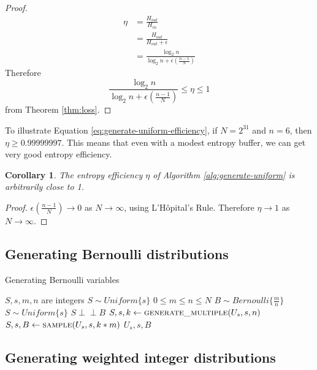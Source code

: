 \documentclass[12pt]{article}
\newtheorem{corollary}{Corollary}
\newcommand{\indep}{\perp\!\!\!\perp}
\begin{document}
\begin{proof}
\begin{align}
    \eta & = \frac{H_{out}}{H_{in}} \\
         & = \frac{H_{out}}{H_{out}+\epsilon} \\
         & = \frac{\log_2n}{\log_2n + \epsilon(\frac{n-1}{N})}
\end{align}
Therefore 
\begin{equation}
\frac{\log_2n}{\log_2n + \epsilon(\frac{n-1}{N})} \le \eta \le 1
\end{equation}
from Theorem \ref{thm:loss}.
\end{proof}

To illustrate Equation \ref{eq:generate-uniform-efficiency}, if $N=2^{31}$ and $n=6$, then $\eta \ge 0.99999997$. This means that even with a modest entropy buffer, we can get very good entropy efficiency.

\begin{corollary}
The entropy efficiency $\eta$ of Algorithm \ref{alg:generate-uniform} is arbitrarily close to 1.
\end{corollary}

\begin{proof}
$\epsilon(\frac{n-1}{N}) \rightarrow 0$ as $N \rightarrow \infty$, using L'H\^opital's Rule. Therefore $\eta \rightarrow 1$ as $N \rightarrow \infty$.
\end{proof}



\subsection{Generating Bernoulli distributions}


\begin{algorithm}
\caption{Generating Bernoulli variables}
\label{alg:generate-bernoulli}
\begin{algorithmic}[1]
\Require $S, s, m, n$ are integers
\Require $S \sim Uniform\{s\}$
\Require $0 \le m \le n\le N$
\Ensure $B \sim Bernoulli\{\frac{m}{n}\}$
\Ensure $S \sim Uniform\{s\}$
\Ensure $S \indep B$
  \State $S, s, k \gets \textsc{generate\_multiple}(U_s, s, n)$
  \State $S, s, B \gets \textsc{sample}(U_s, s, k * m)$
  \State \Return $U_s, s, B$
\EndProcedure
\end{algorithmic}
\end{algorithm}


\subsection{Generating weighted integer distributions}
\end{document}
